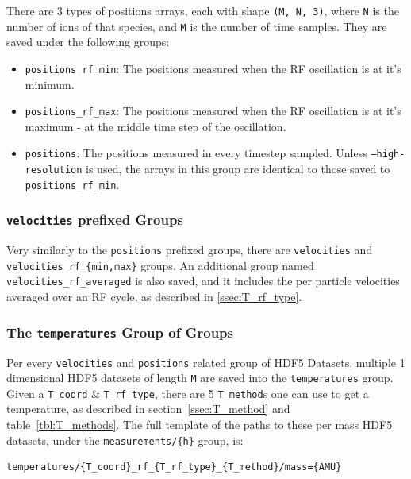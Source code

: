 There are 3 types of positions arrays, each with shape \texttt{(M, N, 3)}, where \texttt{N} is the number of ions of that species, and \texttt{M} is the number of time samples. They are saved under the following groups:

\begin{itemize}
	\item \texttt{positions\_rf\_min}: The positions measured when the RF oscillation is at it's minimum.
	\item \texttt{positions\_rf\_max}: The positions measured when the RF oscillation is at it's maximum - at the middle time step of the oscillation.
	\item \texttt{positions}: The positions measured in every timestep sampled. Unless \texttt{--high-resolution} is used, the arrays in this group are identical to those saved to \texttt{positions\_rf\_min}.
\end{itemize}

\subsubsection{\texttt{velocities} prefixed Groups}

Very similarly to the \texttt{positions} prefixed groups, there are \texttt{velocities} and \texttt{velocities\_rf\_\{min,max\}} groups. An additional group named \texttt{velocities\_rf\_averaged} is also saved, and it includes the per particle velocities averaged over an RF cycle, as described in \ref{ssec:T_rf_type}.

\subsubsection{The \texttt{temperatures} Group of Groups}

Per every \texttt{velocities} and \texttt{positions} related group of HDF5 Datasets, multiple 1 dimensional HDF5 datasets of length \texttt{M} are saved into the \texttt{temperatures} group. Given a \texttt{T\_coord} \& \texttt{T\_rf\_type}, there are 5 \texttt{T\_method}s one can use to get a temperature, as described in section~\ref{ssec:T_method} and table~\ref{tbl:T_methods}. The full template of the paths to these per mass HDF5 datasets, under the \texttt{measurements/\{h\}} group, is:

\begin{verbatim}
temperatures/{T_coord}_rf_{T_rf_type}_{T_method}/mass={AMU}
\end{verbatim}


